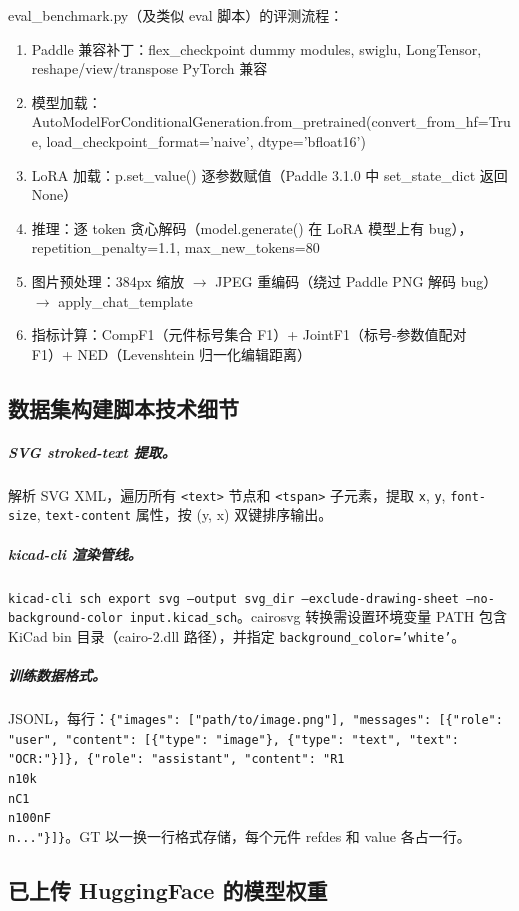eval\_benchmark.py（及类似 eval 脚本）的评测流程：

\begin{enumerate}[nosep]
    \item Paddle 兼容补丁：flex\_checkpoint dummy modules, swiglu, LongTensor, reshape/view/transpose PyTorch 兼容
    \item 模型加载：AutoModelForConditionalGeneration.from\_pretrained(convert\_from\_hf=True, load\_checkpoint\_format='naive', dtype='bfloat16')
    \item LoRA 加载：p.set\_value() 逐参数赋值（Paddle 3.1.0 中 set\_state\_dict 返回 None）
    \item 推理：逐 token 贪心解码（model.generate() 在 LoRA 模型上有 bug），repetition\_penalty=1.1, max\_new\_tokens=80
    \item 图片预处理：384px 缩放 $\to$ JPEG 重编码（绕过 Paddle PNG 解码 bug）$\to$ apply\_chat\_template
    \item 指标计算：CompF1（元件标号集合 F1）+ JointF1（标号-参数值配对 F1）+ NED（Levenshtein 归一化编辑距离）
\end{enumerate}

\subsection{数据集构建脚本技术细节}

\subparagraph{SVG stroked-text 提取。} 解析 SVG XML，遍历所有 \texttt{<text>} 节点和 \texttt{<tspan>} 子元素，提取 \texttt{x}, \texttt{y}, \texttt{font-size}, \texttt{text-content} 属性，按 (y, x) 双键排序输出。

\subparagraph{kicad-cli 渲染管线。} \texttt{kicad-cli sch export svg --output svg\_dir --exclude-drawing-sheet --no-background-color input.kicad\_sch}。cairosvg 转换需设置环境变量 PATH 包含 KiCad bin 目录（cairo-2.dll 路径），并指定 \texttt{background\_color='white'}。

\subparagraph{训练数据格式。} JSONL，每行：\texttt{\{"images": ["path/to/image.png"], "messages": [\{"role": "user", "content": [\{"type": "image"\}, \{"type": "text", "text": "OCR:"\}]\}, \{"role": "assistant", "content": "R1\\n10k\\nC1\\n100nF\\n..."\}]\}}。GT 以一换一行格式存储，每个元件 refdes 和 value 各占一行。

\subsection{已上传 HuggingFace 的模型权重}

